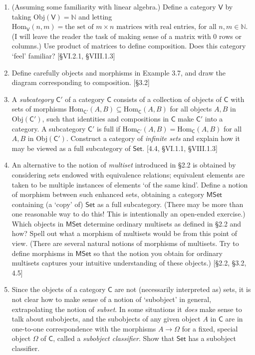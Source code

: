 \begin{enumerate}
    \item (Assuming some familiarity with linear algebra.) Define a category $\mathsf{V}$ by taking $\mathrm{Obj}(\mathsf{V}) = \mathbb{N}$ and letting $\mathrm{Hom}_{\mathsf{V}}(n, m) = \text{the set of } m \times n \text{ matrices with real entries}$, for all $n, m \in \mathbb{N}$. (I will leave the reader the task of making sense of a matrix with 0 rows or columns.) Use product of matrices to define composition. Does this category `feel' familiar? [\S VI.2.1, \S VIII.1.3]

    \item Define carefully objects and morphisms in Example 3.7, and draw the diagram corresponding to composition. [\S3.2]

    \item A \textit{subcategory} $\mathsf{C}'$ of a category $\mathsf{C}$ consists of a collection of objects of $\mathsf{C}$ with sets of morphisms $\mathrm{Hom}_{\mathsf{C}'}(A, B) \subseteq \mathrm{Hom}_{\mathsf{C}}(A, B)$ for all objects $A, B$ in $\mathrm{Obj}(\mathsf{C}')$, such that identities and compositions in $\mathsf{C}$ make $\mathsf{C}'$ into a category. A subcategory $\mathsf{C}'$ is full if $\mathrm{Hom}_{\mathsf{C}'}(A, B) = \mathrm{Hom}_{\mathsf{C}}(A, B)$ for all $A, B$ in $\mathrm{Obj}(\mathsf{C}')$. Construct a category of \textit{infinite sets} and explain how it may be viewed as a full subcategory of $\mathsf{Set}$. [4.4, \S VI.1.1, \S VIII.1.3]

    \item An alternative to the notion of \textit{multiset} introduced in \S2.2 is obtained by considering sets endowed with equivalence relations; equivalent elements are taken to be multiple instances of elements `of the same kind'. Define a notion of morphism between such enhanced sets, obtaining a category $\mathsf{MSet}$ containing (a `copy' of) $\mathsf{Set}$ as a full subcategory. (There may be more than one reasonable way to do this! This is intentionally an open-ended exercise.) Which objects in $\mathsf{MSet}$ determine ordinary multisets as defined in \S2.2 and how? Spell out what a morphism of multisets would be from this point of view. (There are several natural notions of morphisms of multisets. Try to define morphisms in $\mathsf{MSet}$ so that the notion you obtain for ordinary multisets captures your intuitive understanding of these objects.) [\S2.2, \S3.2, 4.5]

    \item Since the objects of a category $\mathsf{C}$ are not (necessarily interpreted as) sets, it is not clear how to make sense of a notion of `subobject' in general, extrapolating the notion of \emph{subset}. In some situations it \textit{does} make sense to talk about subobjects, and the subobjects of any given object $A$ in $\mathsf{C}$ are in one-to-one correspondence with the morphisms $A \to \Omega$ for a fixed, special object $\Omega$ of $\mathsf{C}$, called a \textit{subobject classifier}. Show that $\mathsf{Set}$ has a subobject classifier.
    

\end{enumerate}
